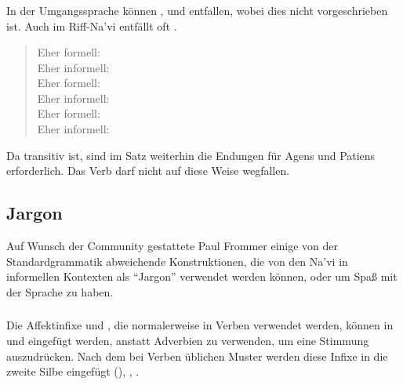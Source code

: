 \subsubsection{} \label{prag:colloq:omit}
In der Umgangssprache können ,  und  entfallen, wobei dies nicht vorgeschrieben ist. Auch im Riff-Na'vi entfällt oft . 

\begin{quotation}
\noindent Eher formell:  \\
\noindent Eher informell:  \\

\noindent Eher formell:  \\
\noindent Eher informell:  \\

\noindent Eher formell:  \\
\noindent Eher informell:  
\end{quotation}

\noindent Da  transitiv ist, sind im Satz  weiterhin die Endungen für Agens und Patiens erforderlich. Das Verb   darf nicht auf diese Weise wegfallen.

\subsection{Jargon} Auf Wunsch der Community gestattete Paul Frommer einige von der Standardgrammatik abweichende Konstruktionen, die von den Na'vi in informellen Kontexten als ``Jargon'' verwendet werden können, oder um Spaß mit der Sprache zu haben.

\subsubsection{}Die Affektinfixe  und , die normalerweise in Verben verwendet werden, können in   und   eingefügt werden, anstatt Adverbien zu verwenden, um eine Stimmung auszudrücken. Nach dem bei Verben üblichen Muster werden diese Infixe in die zweite Silbe eingefügt (), , .

